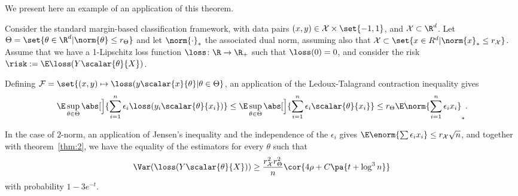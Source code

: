 We present here an example of an application of this theorem.
\begin{example}
    Consider the standard margin-based classification framework, with
    data pairs $(x,y) \in \mathcal{X} \times \set{-1, 1}$, and
    $\mathcal{X} \subset \R^d$. Let $\Theta = \set{\theta \in \R^d |
      \norm{\theta} \leq r_{\Theta}}$ and let $\norm{\cdot}_\ast$ the
    associated dual norm, assuming also that $\mathcal{X} \subset
    \set{x \in R^d | \norm{x}_\ast \leq r_{\mathcal{X}}}$. Assume that
    we have a 1-Lipschitz loss function $\loss \colon \R \to \R_+$
    such that $\loss(0) = 0$, and consider the risk $\risk := \E \loss(Y\scalar{\theta}{X})$.

    Defining $\mathcal{F} = \set{(x,y) \mapsto \loss(y \scalar{x}{\theta} | \theta \in \Theta}$, an application of the Ledoux-Talagrand contraction inequality gives
    \[
    \E \sup_{\theta \in \Theta} \abs[\Big]{\sum_{i=1}^n \epsilon_i\loss(y_i\scalar{\theta}{x_i})}
    \leq \E \sup_{\theta \in \Theta} \abs[\Big]{\sum_{i=1}^n \epsilon_i \scalar{\theta}{x_i}}
    \leq r_{\Theta} \E\norm{\sum_{i=1}^n \epsilon_i x_i}_\ast.
    \]

    In the case of $2$-norm, an application of Jensen's inequality and the independence of the $\epsilon_i$ gives $\E \enorm{\sum \epsilon_i x_i} \leq r_{\mathcal{X}} \sqrt{n}$, and together with theorem~\ref{thm:2}, we have the equality of the estimators for every $\theta$ such that
    \[
        \Var(\loss(Y\scalar{\theta}{X})) \geq \frac{r_{\mathcal{X}}^2 r_{\Theta}^2}{n}\cor{4\rho + C\pa{t + \log^3 n}}
    \]
    with probability $1-3e^{-t}$.
\end{example}


